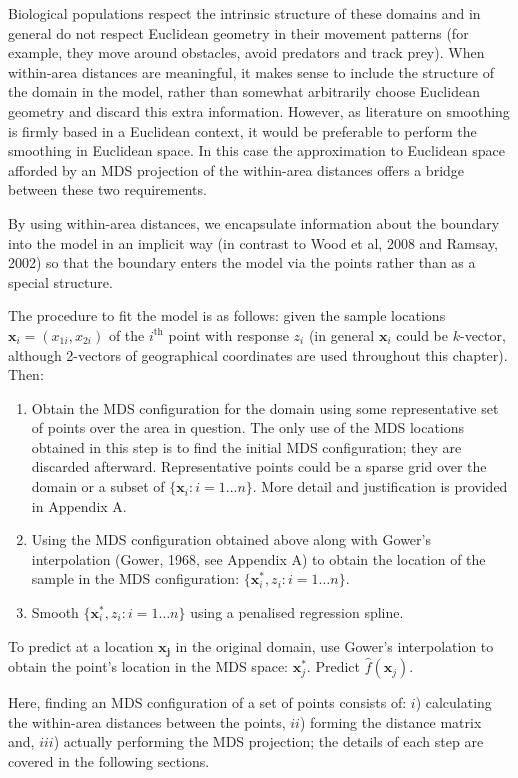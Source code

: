 \documentclass[useAMS,referee]{biom}
\begin{document}
Biological populations respect the intrinsic structure of these domains and in general do not respect Euclidean geometry in their movement patterns (for example, they move around obstacles, avoid predators and track prey). When within-area distances are meaningful, it makes sense to include the structure of the domain in the model, rather than somewhat arbitrarily choose Euclidean geometry and discard this extra information. However, as literature on smoothing is firmly based in a Euclidean context, it would be preferable to perform the smoothing in Euclidean space. In this case the approximation to Euclidean space afforded by an MDS projection of the within-area distances offers a bridge between these two requirements.

By using within-area distances, we encapsulate information about the boundary into the model in an implicit way (in contrast to Wood et al, 2008 and Ramsay, 2002) so that the boundary enters the model via the points rather than as a special structure.

The procedure to fit the model is as follows: given the sample locations $\mathbf{x}_i = (x_{1i}, x_{2i})$  of the $i^\text{th}$ point with response $z_i$ (in general $\mathbf{x}_i$ could be $k$-vector, although 2-vectors of geographical coordinates are used throughout this chapter). Then:
\begin{enumerate}
\item Obtain the MDS configuration for the domain using some representative set of points over the area in question. The only use of the MDS locations obtained in this step is to find the initial MDS configuration; they are discarded afterward. Representative points could be a sparse grid over the domain or a subset of $\{\mathbf{x}_i : i=1\dots n\}$. More detail and justification is provided in Appendix A.
\item Using the MDS configuration obtained above along with Gower's interpolation (Gower, 1968, see Appendix A) to obtain the location of the sample in the MDS configuration: $\{\mathbf{x}_i^*, z_i : i=1\dots n\}$.
\item Smooth $\{\mathbf{x}_i^*, z_i : i=1\dots n\}$ using a penalised regression spline.
\end{enumerate}
To predict at a location $\mathbf{x_j}$ in the original domain, use Gower's interpolation to obtain the point's location in the MDS space: $\mathbf{x}_j^*$. Predict $\hat{f}(\mathbf{x}_j)$.

Here, finding an MDS configuration of a set of points consists of: $i$) calculating the within-area distances between the points, $ii$) forming the distance matrix and, $iii$) actually performing the MDS projection; the details of each step are covered in the following sections.
\end{document}
